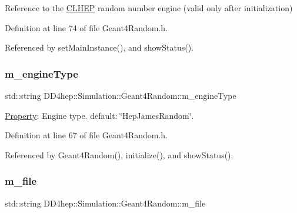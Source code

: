 Reference to the \hyperlink{namespace_c_l_h_e_p}{C\+L\+H\+EP} random number engine (valid only after initialization) 



Definition at line 74 of file Geant4\+Random.\+h.



Referenced by set\+Main\+Instance(), and show\+Status().

\hypertarget{class_d_d4hep_1_1_simulation_1_1_geant4_random_a288d4450519a05e0c2360c4994790cce}{}\label{class_d_d4hep_1_1_simulation_1_1_geant4_random_a288d4450519a05e0c2360c4994790cce} 
\subsubsection{\texorpdfstring{m\+\_\+engine\+Type}{m\_engineType}}
{\footnotesize\ttfamily std\+::string D\+D4hep\+::\+Simulation\+::\+Geant4\+Random\+::m\+\_\+engine\+Type\hspace{0.3cm}{\ttfamily [protected]}}



\hyperlink{class_d_d4hep_1_1_property}{Property}\+: Engine type. default\+: \char`\"{}\+Hep\+James\+Random\char`\"{}. 



Definition at line 67 of file Geant4\+Random.\+h.



Referenced by Geant4\+Random(), initialize(), and show\+Status().

\hypertarget{class_d_d4hep_1_1_simulation_1_1_geant4_random_a0392ac65cdbecdf7aa9663d919246d66}{}\label{class_d_d4hep_1_1_simulation_1_1_geant4_random_a0392ac65cdbecdf7aa9663d919246d66} 
\subsubsection{\texorpdfstring{m\+\_\+file}{m\_file}}
{\footnotesize\ttfamily std\+::string D\+D4hep\+::\+Simulation\+::\+Geant4\+Random\+::m\+\_\+file\hspace{0.3cm}{\ttfamily [protected]}}



